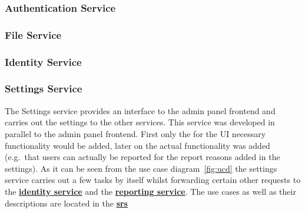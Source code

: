 \subsubsection{Authentication Service}

\subsubsection{File Service}

\subsubsection{Identity Service}
\label{subsubsec:identitySer}

\subsubsection{Settings Service}\label{subsubsec:settingsSer}

The Settings service provides an interface to the admin panel frontend and carries out the settings to the other
services.
This service was developed in parallel to the admin panel frontend. %
First only the for the UI necessary functionality would be added, later on the actual functionality was added
(e.g.\ that users can actually be reported for the report reasons added in the settings).
As it can be seen from the use case diagram~\ref{fig:ucd} the settings service carries out a few tasks by itself whilst
forwarding certain other requests to the \hyperref[subsubsec:identitySer]{\textbf{identity service}} and the
\hyperref[subsubsec:reportingSer]{\textbf{reporting service}}.
The use cases as well as their descriptions are located in the
\hyperref[ch:software-requirements-specification-(srs)]{\textbf{\ac{srs}}}

